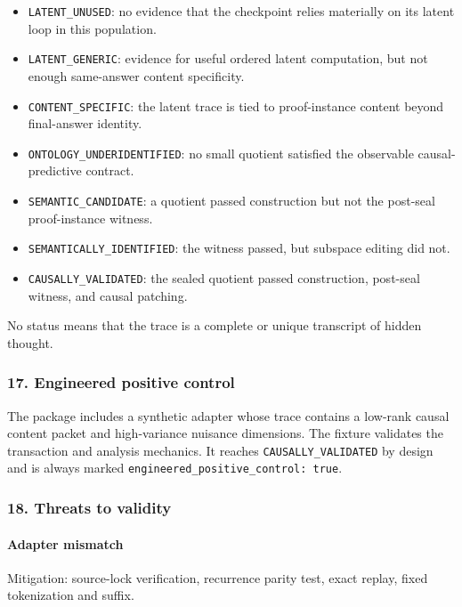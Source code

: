 \documentclass[
  10pt,
]{article}
\providecommand{\tightlist}{%
  \setlength{\itemsep}{0pt}\setlength{\parskip}{0pt}}
\begin{document}
\begin{itemize}
\tightlist
\item
  \texttt{LATENT\_UNUSED}: no evidence that the checkpoint relies
  materially on its latent loop in this population.
\item
  \texttt{LATENT\_GENERIC}: evidence for useful ordered latent
  computation, but not enough same-answer content specificity.
\item
  \texttt{CONTENT\_SPECIFIC}: the latent trace is tied to proof-instance
  content beyond final-answer identity.
\item
  \texttt{ONTOLOGY\_UNDERIDENTIFIED}: no small quotient satisfied the
  observable causal-predictive contract.
\item
  \texttt{SEMANTIC\_CANDIDATE}: a quotient passed construction but not
  the post-seal proof-instance witness.
\item
  \texttt{SEMANTICALLY\_IDENTIFIED}: the witness passed, but subspace
  editing did not.
\item
  \texttt{CAUSALLY\_VALIDATED}: the sealed quotient passed construction,
  post-seal witness, and causal patching.
\end{itemize}

No status means that the trace is a complete or unique transcript of
hidden thought.

\subsubsection{17. Engineered positive
control}\label{engineered-positive-control}

The package includes a synthetic adapter whose trace contains a low-rank
causal content packet and high-variance nuisance dimensions. The fixture
validates the transaction and analysis mechanics. It reaches
\texttt{CAUSALLY\_VALIDATED} by design and is always marked
\texttt{engineered\_positive\_control:\ true}.

\subsubsection{18. Threats to validity}\label{threats-to-validity}

\paragraph{Adapter mismatch}\label{adapter-mismatch}

Mitigation: source-lock verification, recurrence parity test, exact
replay, fixed tokenization and suffix.
\end{document}
